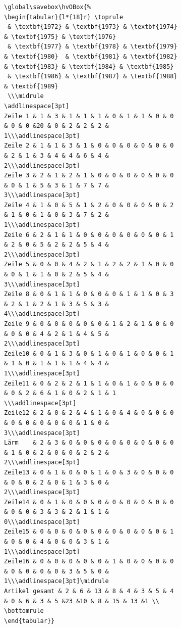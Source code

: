 \documentclass[twoside,paper=a4,usegeometry]{scrartcl}
\begin{document}
\begin{figure}[p]
\begin{figure}[p]
\begin{lstlisting}[basicstyle=\footnotesize\ttfamily]
\global\savebox\hvOBox{%
\begin{tabular}{l*{18}r} \toprule
 & \textbf{1972} & \textbf{1973} & \textbf{1974} & \textbf{1975} & \textbf{1976} 
 & \textbf{1977} & \textbf{1978} & \textbf{1979} & \textbf{1980}  & \textbf{1981} & \textbf{1982} & \textbf{1983} & \textbf{1984} & \textbf{1985}
 & \textbf{1986} & \textbf{1987} & \textbf{1988} & \textbf{1989}
 \\\midrule
\addlinespace[3pt]
Zeile 1 & 1 & 3 & 1 & 1 & 1 & 0 & 1 & 1 & 0 & 0 & 0 & 0 &20 & 0 & 2 & 2 & 2 & 1\\\addlinespace[3pt]
Zeile 2 & 1 & 1 & 3 & 1 & 0 & 0 & 0 & 0 & 0 & 0 & 2 & 1 & 3 & 4 & 4 & 6 & 4 & 2\\\addlinespace[3pt]
Zeile 3 & 2 & 1 & 2 & 1 & 0 & 0 & 0 & 0 & 0 & 0 & 0 & 1 & 5 & 3 & 1 & 7 & 7 & 3\\\addlinespace[3pt]
Zeile 4 & 1 & 0 & 5 & 1 & 2 & 0 & 0 & 0 & 0 & 2 & 1 & 0 & 1 & 0 & 3 & 7 & 2 & 1\\\addlinespace[3pt]
Zeile 6 & 2 & 1 & 1 & 0 & 0 & 0 & 0 & 0 & 0 & 1 & 2 & 0 & 5 & 2 & 2 & 5 & 4 & 2\\\addlinespace[3pt]
Zeile 5 & 0 & 0 & 4 & 2 & 1 & 2 & 2 & 1 & 0 & 0 & 0 & 1 & 1 & 0 & 2 & 5 & 4 & 3\\\addlinespace[3pt]
Zeile 8 & 0 & 1 & 1 & 0 & 0 & 0 & 1 & 1 & 0 & 3 & 2 & 1 & 2 & 1 & 3 & 5 & 3 & 4\\\addlinespace[3pt]
Zeile 9 & 0 & 0 & 0 & 0 & 0 & 1 & 2 & 1 & 0 & 0 & 0 & 0 & 4 & 2 & 1 & 4 & 5 & 2\\\addlinespace[3pt]
Zeile10 & 0 & 1 & 3 & 0 & 1 & 0 & 1 & 0 & 0 & 1 & 1 & 0 & 1 & 1 & 1 & 4 & 4 & 1\\\addlinespace[3pt]
Zeile11 & 0 & 2 & 2 & 1 & 1 & 0 & 1 & 0 & 0 & 0 & 0 & 2 & 6 & 1 & 0 & 2 & 1 & 1 \\\addlinespace[3pt]
Zeile12 & 2 & 0 & 2 & 4 & 1 & 0 & 4 & 0 & 0 & 0 & 0 & 0 & 0 & 0 & 0 & 1 & 0 & 3\\\addlinespace[3pt]
Lärm    & 2 & 3 & 0 & 0 & 0 & 0 & 0 & 0 & 0 & 0 & 1 & 0 & 2 & 0 & 0 & 2 & 2 & 2\\\addlinespace[3pt]
Zeile13 & 0 & 1 & 0 & 0 & 1 & 0 & 3 & 0 & 0 & 0 & 0 & 0 & 2 & 0 & 1 & 3 & 0 & 2\\\addlinespace[3pt]
Zeile14 & 0 & 1 & 0 & 0 & 0 & 0 & 0 & 0 & 0 & 0 & 0 & 0 & 3 & 3 & 2 & 1 & 1 & 0\\\addlinespace[3pt]
Zeile15 & 0 & 0 & 0 & 0 & 0 & 0 & 0 & 0 & 0 & 1 & 0 & 0 & 4 & 0 & 0 & 3 & 1 & 1\\\addlinespace[3pt]
Zeile16 & 0 & 0 & 0 & 0 & 0 & 1 & 0 & 0 & 0 & 0 & 0 & 0 & 0 & 0 & 3 & 5 & 0 & 1\\\addlinespace[3pt]\midrule
Artikel gesamt & 2 & 6 & 13 & 8 & 4 & 3 & 5 & 4 & 0 & 6 & 3 & 5 &23 &10 & 8 & 15 & 13 &1 \\
\bottomrule
\end{tabular}}


\end{lstlisting}
\end{figure}
\end{figure}
\end{document}
